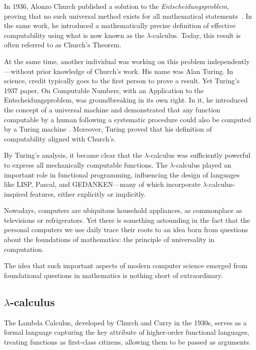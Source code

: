  In 1936, Alonzo Church published a solution to the \emph{Entscheidungsproblem}, proving that no such universal method exists for all mathematical statements~\cite{church1936}. In the same work, he introduced a mathematically precise definition of effective computability using what is now known as the $\lambda$-calculus. Today, this result is often referred to as Church’s Theorem.

 At the same time, another individual was working on this problem independently—without prior knowledge of Church’s work. His name was Alan Turing. In science, credit typically goes to the first person to prove a result. Yet Turing’s 1937 paper, On Computable Numbers, with an Application to the Entscheidungsproblem, was groundbreaking in its own right. In it, he introduced the concept of a universal machine and demonstrated that any function computable by a human following a systematic procedure could also be computed by a Turing machine \cite{turingComputableNumbersApplication1937}. Moreover, Turing proved that his definition of computability aligned with Church’s.

By Turing’s analysis, it became clear that the $\lambda$-calculus was sufficiently powerful to express all mechanically computable functions.
The $\lambda$-calculus played an important role in functional programming, influencing the design of languages like LISP, Pascal, and GEDANKEN—many of which incorporate $\lambda$-calculus-inspired features, either explicitly or implicitly.

Nowadays, computers are ubiquitous household appliances, as commonplace as televisions or refrigerators. Yet there is  something astounding in the fact that the personal computers we use daily trace their roots to an idea born from questions about the foundations of mathematics: the principle of universality in computation. 

The idea that such important aspects of modern computer science emerged from foundational questions in mathematics is nothing short of extraordinary.




\subsection*{$\lambda$-calculus}

The Lambda Calculus, developed by Church and Curry in the 1930s, serves as a formal language capturing the key attribute of higher-order functional languages, treating functions as first-class citizens, allowing them to be passed as arguments. 

